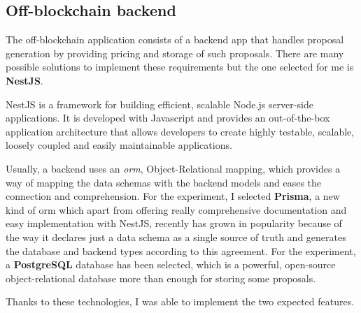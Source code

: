 \subsection{Off-blockchain backend}
{
The off-blockchain application consists of a backend app that handles proposal generation by providing pricing and storage of such proposals. There are many possible solutions to implement these requirements but the one selected for me is \textbf{NestJS}\cite{nestjs}.

NestJS is a framework for building efficient, scalable Node.js server-side applications. It is developed with Javascript\cite{javascript} and provides an out-of-the-box application architecture that allows developers to create highly testable, scalable, loosely coupled and easily maintainable applications.

Usually, a backend uses an \textit{\Gls{orm}}, Object-Relational mapping, which provides a way of mapping the data schemas with the backend models and eases the connection and comprehension. For the experiment, I selected \textbf{Prisma}, a new kind of \Gls{orm} which apart from offering really comprehensive documentation and easy implementation with NestJS, recently has grown in popularity because of the way it declares just a data schema as a single source of truth and generates the database and backend types according to this agreement. For the experiment, a \textbf{PostgreSQL}\cite{postgresql} database has been selected, which is a powerful, open-source object-relational database more than enough for storing some proposals.

Thanks to these technologies, I was able to implement the two expected features.

}
